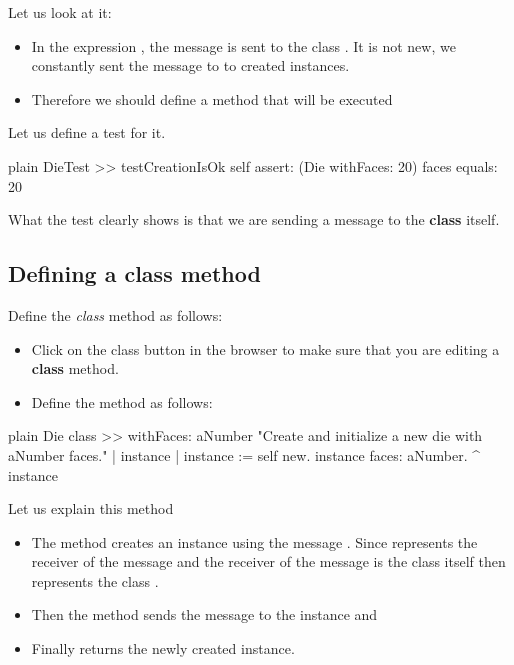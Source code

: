\documentclass[10pt,twoside,english]{_support/latex/sbabook/sbabook}
\begin{document}
Let us look at it: 

\begin{itemize}
\item In the expression , the message  is sent to the class . It is not new, we constantly sent the message  to  to created instances. 
\item Therefore we should define a method that will be executed 
\end{itemize}

Let us define a test for it.

\begin{displaycode}{plain}
DieTest >> testCreationIsOk
	self assert: (Die withFaces: 20) faces equals: 20
\end{displaycode}

What the test clearly shows is that we are sending a message to the \textbf{class}  itself.
\subsection{Defining a class method}
Define the \textit{class} method  as follows:

\begin{itemize}
\item Click on the class button in the browser to make sure that you are editing a \textbf{class} method.
\item Define the method as follows: 
\end{itemize}

\begin{displaycode}{plain}
Die class >> withFaces: aNumber
	"Create and initialize a new die with aNumber faces."
	| instance |
	instance := self new.
	instance faces: aNumber.
	^ instance
\end{displaycode}

Let us explain this method

\begin{itemize}
\item The method  creates an instance using the message . Since  represents the receiver of the message and the receiver of the message is the class  itself then  represents the class . 
\item Then the method sends the message  to the instance and 
\item Finally returns the newly created instance.
\end{itemize}
\end{document}
